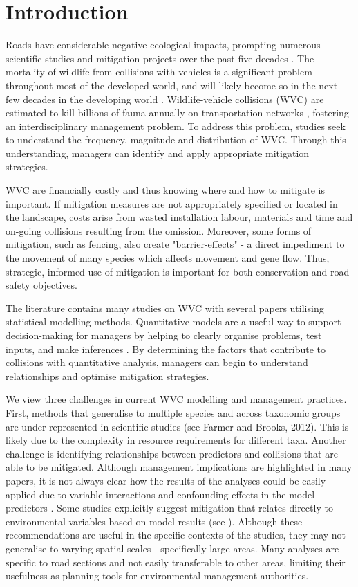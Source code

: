 \newpage
\section{Introduction}

Roads have considerable negative ecological impacts, prompting numerous scientific studies and mitigation projects over the past five decades \citep{form98,spel98,rvdr15}. The mortality of wildlife from collisions with vehicles is a significant problem throughout most of the developed world, and will likely become so in the next few decades in the developing world \citep{rvdr15}. Wildlife-vehicle collisions (WVC) are estimated to kill billions of fauna annually on transportation networks \citep{seil06}, fostering an interdisciplinary management problem. To address this problem, studies seek to understand the frequency, magnitude and distribution of WVC.  Through this understanding, managers can identify and apply appropriate mitigation strategies.

WVC are financially costly \citep{biss08,huij09,rowd08} and thus knowing where and how to mitigate is important.  If mitigation measures are not appropriately specified or located in the landscape, costs arise from wasted installation labour, materials and time and on-going collisions resulting from the omission.  Moreover, some forms of mitigation, such as fencing, also create "barrier-effects" - a direct impediment to the movement of many species which affects movement and gene flow.  Thus, strategic, informed use of mitigation is important for both conservation and road safety objectives.

The literature contains many studies on WVC with several papers utilising statistical modelling methods.  Quantitative models are a useful way to support decision-making for managers by helping to clearly organise problems, test inputs, and make inferences \citep{ande15}.  By determining the factors that contribute to collisions with quantitative analysis, managers can begin to understand relationships and optimise mitigation strategies.

We view three challenges in current WVC modelling and management practices.  First, methods that generalise to multiple species and across taxonomic groups are under-represented in scientific studies (see Farmer and Brooks, 2012).  This is likely due to the complexity in resource requirements for different taxa.  Another challenge is identifying relationships between predictors and collisions that are able to be mitigated.  Although management implications are highlighted in many papers, it is not always clear how the results of the analyses could be easily applied due to variable interactions and confounding effects in the model predictors \citep{guns11}.  Some studies explicitly suggest mitigation that relates directly to environmental variables based on model results (see \cite{gril09}).  Although these recommendations are useful in the specific contexts of the studies, they may not generalise to varying spatial scales - specifically large areas.  Many analyses are specific to road sections and not easily transferable to other areas, limiting their usefulness as planning tools for environmental management authorities.

